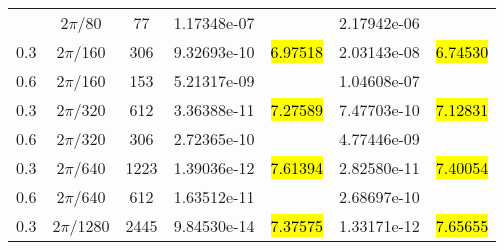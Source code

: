 \begin{table}[htbp]
	\label{ta:1D-ex3-HHC8}
	\centering
	\begin{tabular}{ccccccc}
		\toprule
		\titleintable
		\midrule
		0.6 & $2\pi$/80   & 77   & 1.17348e-07 &              & 2.17942e-06 &              \\
		0.3 & $2\pi$/160  & 306  & 9.32693e-10 & \hl{6.97518} & 2.03143e-08 & \hl{6.74530} \\
		\midrule
		0.6 & $2\pi$/160  & 153  & 5.21317e-09 &              & 1.04608e-07 &              \\
		0.3 & $2\pi$/320  & 612  & 3.36388e-11 & \hl{7.27589} & 7.47703e-10 & \hl{7.12831} \\
		\midrule
		0.6 & $2\pi$/320  & 306  & 2.72365e-10 &              & 4.77446e-09 &              \\
		0.3 & $2\pi$/640  & 1223 & 1.39036e-12 & \hl{7.61394} & 2.82580e-11 & \hl{7.40054} \\
		\midrule
		0.6 & $2\pi$/640  & 612  & 1.63512e-11 &              & 2.68697e-10 &              \\
		0.3 & $2\pi$/1280 & 2445 & 9.84530e-14 & \hl{7.37575} & 1.33171e-12 & \hl{7.65655} \\
		\bottomrule
	\end{tabular}
\end{table}
\undef\titleintable